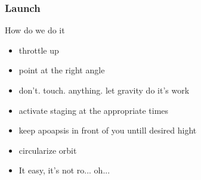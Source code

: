 {\begin{frame}
\end{frame}
\begin{frame}
    \frametitle{Launch}
    \begin{block}{How do we do it}
        \begin{itemize}
            \item throttle up
            \item point at the right angle
            \item don't. touch. anything. let gravity do it's work
            \item activate staging at the appropriate times
            \item keep apoapsis in front of you untill desired hight
            \item circularize orbit
            \item It easy, it's not ro... oh...
        \end{itemize}
    \end{block}
\end{frame}
}
